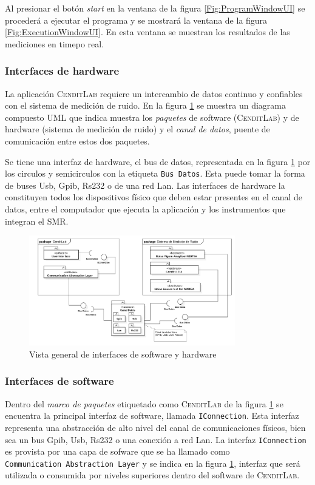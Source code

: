 \documentclass[paper=a4,oneside,fontsize=12pt]{article}
\newcommand{\AppName}{\textsc{CenditLab}\xspace}
\newcommand{\smr}{sistema de medición de ruido}
\newcommand{\SMR}{SMR\xspace}
\begin{document}
	Al presionar el botón \emph{start} en la ventana de la figura \ref{Fig:ProgramWindowUI} se procederá a ejecutar el programa y se mostrará la ventana de la figura \ref{Fig:ExecutionWindowUI}. En  esta ventana se muestran los resultados de las mediciones en timepo real.
	
	\subsubsection{Interfaces de hardware}
	
	La aplicación \AppName requiere un intercambio de datos continuo y confiables con el \smr. En la figura \ref{Fig:MainSystemPackagesUML} se muestra un diagrama compuesto UML que indica muestra los \emph{paquetes} de software (\AppName) y de hardware (\smr) y el \emph{canal de datos}, puente de comunicación entre estos dos paquetes.
	
	Se tiene una interfaz de hardware, el bus de datos, representada en la figura \ref{Fig:MainSystemPackagesUML} por los circulos y semicirculos con la etiqueta \texttt{Bus Datos}. Esta puede tomar la forma de buses Usb, Gpib, Rs232 o de una red Lan. Las interfaces de hardware la constituyen todos los dispositivos físico que deben estar presentes en el canal de datos, entre el computador que ejecuta la aplicación y los instrumentos que integran el \SMR.	
	
	\begin{figure}[H]
		\centering
		\includegraphics[width=0.8\textwidth]{Imagenes/MainSystemPackagesUML.pdf}
		\caption{Vista general de interfaces de software y hardware}
		\label{Fig:MainSystemPackagesUML}
	\end{figure}
	
	\subsubsection{Interfaces de software}
	
	Dentro del \emph{marco de paquetes} etiquetado como \AppName de la figura \ref{Fig:MainSystemPackagesUML} se encuentra la principal interfaz de software, llamada \texttt{IConnection}. Esta interfaz representa una abstracción de alto nivel del canal de comunicaciones físicos, bien sea un bus Gpib, Usb, Rs232 o una conexión a red Lan. La interfaz \texttt{IConnection} es provista por una capa de sofware que se ha llamado como \texttt{Communication~Abstraction~Layer} y se indica en la figura \ref{Fig:MainSystemPackagesUML}, interfaz que será utilizada o consumida por niveles superiores dentro del software de \AppName.
	
\end{document}
